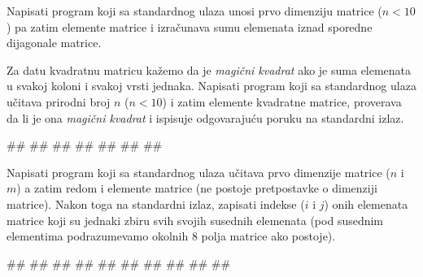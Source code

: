 \begin{Exercise}[label=p1.2_] 
Napisati program koji sa standardnog ulaza unosi prvo dimenziju
matrice ($n<10$) pa zatim elemente matrice i izra\v cunava sumu
elemenata iznad sporedne dijagonale matrice.
\end{Exercise}
\begin{Answer}[ref=p1.2_]
\end{Answer}


\begin{Exercise}[label=p1.2_] 
Za datu kvadratnu matricu ka\v zemo da je \emph{magi\v cni
kvadrat} ako je suma elemenata u svakoj koloni i svakoj vrsti
jednaka. Napisati program koji sa standardnog ulaza u\v citava
prirodni broj $n$ ($n<10$) i zatim elemente kvadratne matrice,
proverava da li je ona \emph{magi\v cni kvadrat} i ispisuje
odgovaraju\' cu poruku na standardni izlaz. \\
\begin{miditest}
\begin{upotreba}{1}
#\naslovInt#
##
##
##
##
##
##
\end{upotreba}
\end{miditest}
\end{Exercise}
\begin{Answer}[ref=p1.2_]
\end{Answer}


\begin{Exercise}[label=p1.2_] 
Napisati program koji sa standardnog ulaza u\v citava prvo dimenzije
matrice ($n$ i $m$) a zatim redom i elemente matrice (ne postoje
pretpostavke o dimenziji matrice). Nakon toga na standardni izlaz,
zapisati indekse ($i$ i $j$) onih elemenata matrice koji su jednaki
zbiru svih svojih susednih elemenata (pod susednim elementima
podrazumevamo okolnih $8$ polja matrice ako postoje). \\
\begin{miditest}
\begin{upotreba}{1}
#\naslovInt#
##
##
##
##
##
##
##
##
##
\end{upotreba}
\end{miditest}
\end{Exercise}
\begin{Answer}[ref=p1.2_]
\end{Answer}


